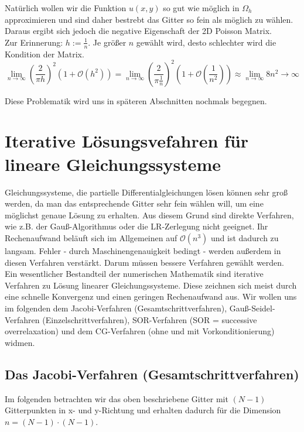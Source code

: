 Natürlich wollen wir die Funktion $u(x,y)$ so gut wie möglich in $\Omega_{h}$ approximieren und sind daher bestrebt das Gitter so fein als möglich zu wählen. Daraus ergibt sich jedoch die negative Eigenschaft der 2D Poisson Matrix. \\
Zur Erinnerung: $h := \frac {1} {n}$. Je größer $n$ gewählt wird, desto schlechter wird die Kondition der Matrix.
\begin{equation}
\lim_{n \to \infty} \left( \frac {2} {\pi h} \right)^{2} (1 + \mathcal{O}(h^{2})) = \lim_{n \to \infty} \left( \frac {2} {\pi \frac {1} {n}} \right)^{2} (1 + \mathcal{O}(\frac {1} {n^{2}})) \approx \lim_{n \to \infty} 8 n^{2} \longrightarrow \infty
\end{equation}

Diese Problematik wird uns in späteren Abschnitten nochmals begegnen.


\chapter{Iterative Lösungsvefahren für lineare Gleichungssysteme}\label{c.IterativeVerfahren}

Gleichungssysteme, die partielle Differentialgleichungen lösen können sehr groß werden, da man das entsprechende Gitter sehr fein wählen will, um eine möglichst genaue Lösung zu erhalten. Aus diesem Grund sind direkte Verfahren, wie z.B. der Gauß-Algorithmus oder die LR-Zerlegung nicht geeignet. Ihr Rechenaufwand beläuft sich im Allgemeinen auf $\mathcal{O}(n^{3})$ und ist dadurch zu langsam. Fehler - durch Maschinengenauigkeit bedingt - werden außerdem in diesen Verfahren verstärkt. Darum müssen bessere Verfahren gewählt werden. \\
Ein wesentlicher Bestandteil der numerischen Mathematik sind iterative Verfahren zu Lösung linearer Gleichungssysteme. Diese zeichnen sich meist durch eine schnelle Konvergenz und einen geringen Rechenaufwand aus. Wir wollen uns im folgenden dem Jacobi-Verfahren (Gesamtschrittverfahren), Gauß-Seidel-Verfahren (Einzelschrittverfahren), SOR-Verfahren (SOR = successive overrelaxation) und dem CG-Verfahren (ohne und mit Vorkonditionierung) widmen.

\section{Das Jacobi-Verfahren (Gesamtschrittverfahren)}\label{s.Das Jacobi-Iterationsverfahren}

Im folgenden betrachten wir das oben beschriebene Gitter mit $(N-1)$ Gitterpunkten in x- und y-Richtung und erhalten dadurch für die Dimension $n = (N-1) \cdot (N-1)$. \\


